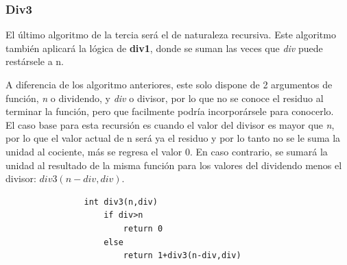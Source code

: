 \documentclass{report}
\begin{document}
        \subsubsection*{Div3}
            El último algoritmo de la tercia ser\'a el de naturaleza recursiva. Este algoritmo también aplicará la lógica de \textbf{div1}, donde se suman las veces que \textit{div} puede restársele a n.
            
            A diferencia de los algoritmo anteriores, este solo dispone de 2 argumentos de función, \textit{n} o dividendo, y \textit{div} o divisor, por lo que no se conoce el residuo al terminar la función, pero que facilmente podría incorporársele para conocerlo.\\
            
            El caso base para esta recursión es cuando el valor del divisor es mayor que \textit{n}, por lo que el valor actual de n será ya el residuo y por lo tanto no se le suma la unidad al cociente, más se regresa el valor 0. En caso contrario, se sumará la unidad al resultado de la misma función para los valores del dividendo menos el divisor: $div3(n-div,div)$.
            \begin{verbatim}
                int div3(n,div)
                    if div>n
                        return 0
                    else
                        return 1+div3(n-div,div)
            \end{verbatim}
\end{document}
